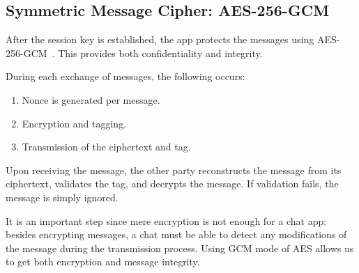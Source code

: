 \subsection{Symmetric Message Cipher: AES-256-GCM}
After the session key is established, the app protects the messages using AES-256-GCM~\cite{gcm}. This provides both confidentiality and integrity.

During each exchange of messages, the following occurs:
\begin{enumerate}
    \item Nonce is generated per message.
    \item Encryption and tagging.
    \item Transmission of the ciphertext and tag.
\end{enumerate}
Upon receiving the message, the other party reconstructs the message from its ciphertext, validates the tag, and decrypts the message. If validation fails, the message is simply ignored.

It is an important step since mere encryption is not enough for a chat app: besides encrypting messages, a chat must be able to detect any modifications of the message during the transmission process. Using GCM mode of AES allows us to get both encryption and message integrity.

